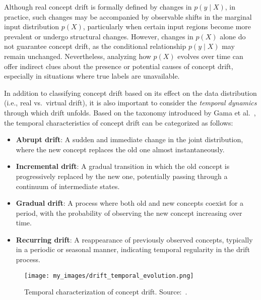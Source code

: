 Although real concept drift is formally defined by changes in $ p(y \mid X) $,
in practice, such changes may be accompanied by observable shifts in the
marginal input distribution $ p(X) $, particularly when certain input regions
become more prevalent or undergo structural changes. However, changes in $ p(X)
$ alone do not guarantee concept drift, as the conditional relationship $ p(y
    \mid X) $ may remain unchanged. Nevertheless, analyzing how $ p(X) $ evolves
over time can offer indirect clues about the presence or potential causes of
concept drift, especially in situations where true labels are unavailable.

In addition to classifying concept drift based on its effect on the data
distribution (i.e., real vs.\ virtual drift), it is also important to consider
the \textit{temporal dynamics} through which drift unfolds. Based on the
taxonomy introduced by Gama et al.~\cite{drift_adaptation_survey}, the temporal
characteristics of concept drift can be categorized as follows:

\begin{itemize}
    \item \textbf{Abrupt drift}: A sudden and immediate change in the joint
          distribution, where the new concept replaces the old one almost
          instantaneously.

    \item \textbf{Incremental drift}: A gradual transition in which the old
          concept is progressively replaced by the new one, potentially passing
          through a continuum of intermediate states.

    \item \textbf{Gradual drift}: A process where both old and new concepts
          coexist for a period, with the probability of observing the new concept
          increasing over time.

    \item \textbf{Recurring drift}: A reappearance of previously
          observed concepts, typically in a periodic or seasonal manner, indicating
          temporal regularity in the drift process.
\end{itemize}

\begin{figure}[H]
    \centering
    \texttt{[image: my\_images/drift\_temporal\_evolution.png]}
    \caption{Temporal characterization of concept drift. Source:~\cite{drift_adaptation_survey}.}\label{fig:concept_drift_characterization}
\end{figure}

